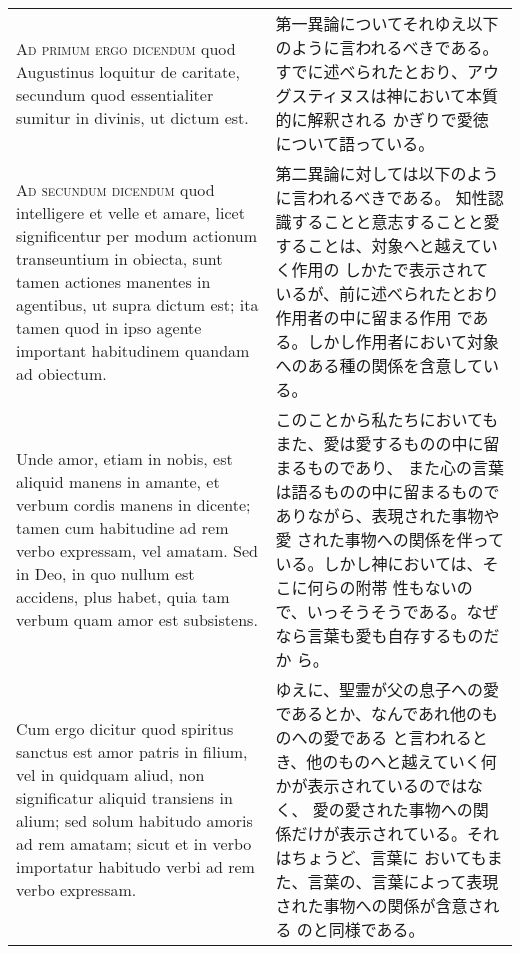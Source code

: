 \documentclass[10pt]{jsarticle} %
\begin{document}
\begin{longtable}{p{21em}p{21em}}
\\



{\scshape Ad primum ergo dicendum} quod Augustinus loquitur de caritate, secundum
quod essentialiter sumitur in divinis, ut dictum est.


&

第一異論についてそれゆえ以下のように言われるべきである。
すでに述べられたとおり、アウグスティヌスは神において本質的に解釈される
かぎりで愛徳について語っている。

\\



{\scshape Ad secundum dicendum} quod intelligere et velle et amare, licet
significentur per modum actionum transeuntium in obiecta, sunt tamen
actiones manentes in agentibus, ut supra dictum est; ita tamen quod in
ipso agente important habitudinem quandam ad obiectum. 

&

第二異論に対しては以下のように言われるべきである。
知性認識することと意志することと愛することは、対象へと越えていく作用の
 しかたで表示されているが、前に述べられたとおり作用者の中に留まる作用
 である。しかし作用者において対象へのある種の関係を含意している。

\\



Unde amor,
etiam in nobis, est aliquid manens in amante, et verbum cordis manens
in dicente; tamen cum habitudine ad rem verbo expressam, vel
amatam. Sed in Deo, in quo nullum est accidens, plus habet, quia tam
verbum quam amor est subsistens. 

&

このことから私たちにおいてもまた、愛は愛するものの中に留まるものであり、
また心の言葉は語るものの中に留まるものでありながら、表現された事物や愛
 された事物への関係を伴っている。しかし神においては、そこに何らの附帯
 性もないので、いっそうそうである。なぜなら言葉も愛も自存するものだか
 ら。

\\



Cum ergo dicitur quod spiritus
sanctus est amor patris in filium, vel in quidquam aliud, non
significatur aliquid transiens in alium; sed solum habitudo amoris ad
rem amatam; sicut et in verbo importatur habitudo verbi ad rem verbo
expressam.


&

ゆえに、聖霊が父の息子への愛であるとか、なんであれ他のものへの愛である
 と言われるとき、他のものへと越えていく何かが表示されているのではなく、
 愛の愛された事物への関係だけが表示されている。それはちょうど、言葉に
 おいてもまた、言葉の、言葉によって表現された事物への関係が含意される
 のと同様である。



\end{longtable}
\end{document}
